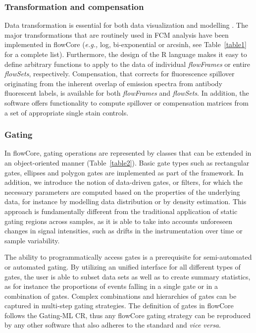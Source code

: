 \documentclass[10pt]{bmc_article}
\newcommand{\Rpackage}[1]{{\textsf{#1}}}
\newcommand{\Rclass}[1]{{\textit{#1}}}
\newenvironment{bmcformat}{\begin{raggedright}\baselineskip20pt\sloppy\setboolean{publ}{false}}{\end{raggedright}\baselineskip20pt\sloppy}
\begin{document}
\begin{bmcformat}
\subsubsection*{Transformation and compensation}
Data transformation is essential for both data visualization and
modelling \cite{lo2008agf}. The major transformations that are
routinely used in FCM analysis have been implemented in
\Rpackage{flowCore} (\textit{e.g.,} log, bi-exponential or arcsinh,
see Table~\ref{table1} for a complete list). Furthermore, the design
of the R language makes it easy to define arbitrary functions to apply
to the data of individual \Rclass{flowFrames} or entire
\Rclass{flowSets}, respectively. Compensation, that corrects for
fluorescence spillover originating from the inherent overlap of
emission spectra from antibody fluorescent labels, is available for
both \Rclass{flowFrames} and \Rclass{flowSets}. In addition, the
software offers functionality to compute spillover or compensation
matrices from a set of appropriate single stain controls.


\subsubsection*{Gating}
In \Rpackage{flowCore}, gating operations are represented by classes
that can be extended in an object-oriented manner
(Table~\ref{table2}). Basic gate types such as rectangular gates,
ellipses and polygon gates are implemented as part of the
framework. In addition, we introduce the notion of data-driven gates,
or filters, for which the necessary parameters are computed based on
the properties of the underlying data, for instance by modelling data
distribution or by density estimation. This approach is fundamentally
different from the traditional application of static gating regions
across samples, as it is able to take into accounts unforeseen changes
in signal intensities, such as drifts in the instrumentation
over time or sample variability.

The ability to programmatically access gates is a prerequisite for
semi-automated or automated gating. By utilizing an unified interface
for all different types of gates, the user is able to subset data sets
as well as to create summary statistics, as for instance the
proportions of events falling in a single gate or in a combination of
gates. Complex combinations and hierarchies of gates can be captured
in multi-step gating strategies. The definition of gates in
\Rpackage{flowCore} follows the Gating-ML CR, thus any
\Rpackage{flowCore} gating strategy can be reproduced by any other
software that also adheres to the standard and \textit{vice versa}.


\end{bmcformat}
\end{document}
